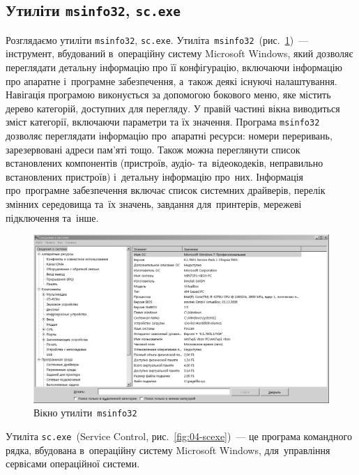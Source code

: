 \documentclass[
	a4paper,
	oneside,
	DIV = 12,
	BCOR = 10mm,
	12pt,
	headings = normal,
]{scrartcl}
\newcommand{\progname}[1]{\texttt{#1}}
\begin{document}
		\subsection{Утиліти \progname{msinfo32}, \progname{sc.exe}}
			Розглядаємо утиліти \progname{msinfo32}, \progname{sc.exe}. Утиліта~\progname{msinfo32}~(рис.~\ref{fig:03-msinfo})~— інструмент, вбудований в~операційну систему Microsoft Windows, який дозволяє переглядати детальну інформацію про її конфігурацію, включаючи інформацію про апаратне і~програмне забезпечення, а~також деякі існуючі налаштування. Навігація програмою виконується за допомогою бокового меню, яке містить дерево категорій, доступних для перегляду. У правій частині вікна виводиться зміст категорії, включаючи параметри та їх значення.
			Програма \texttt{msinfo32} дозволяє переглядати інформацію про~апаратні ресурси: номери переривань, зарезервовані адреси пам'яті тощо. Також можна переглянути список встановлених компонентів (пристроїв, аудіо- та~відеокодеків, неправильно встановлених пристроїв) і~детальну інформацію про~них. Інформація про~програмне забезпечення включає список системних драйверів, перелік змінних середовища та~їх значень, завдання для~принтерів, мережеві підключення та~інше.

			\begin{figure}[!htb]
				\centering
				\includegraphics[height = 12\baselineskip]{./assets/y03s01-syssoft-lab-01-scr-03-msinfo-bw.png}
				\caption{Вікно утиліти~\progname{msinfo32}}
				\label{fig:03-msinfo}
			\end{figure}
			
			Утиліта \progname{sc.exe}~(Service Control, рис.~\ref{fig:04-scexe})~— це програма командного рядка, вбудована в~операційну систему Microsoft Windows, для~управління сервісами операційної системи.
\end{document}

